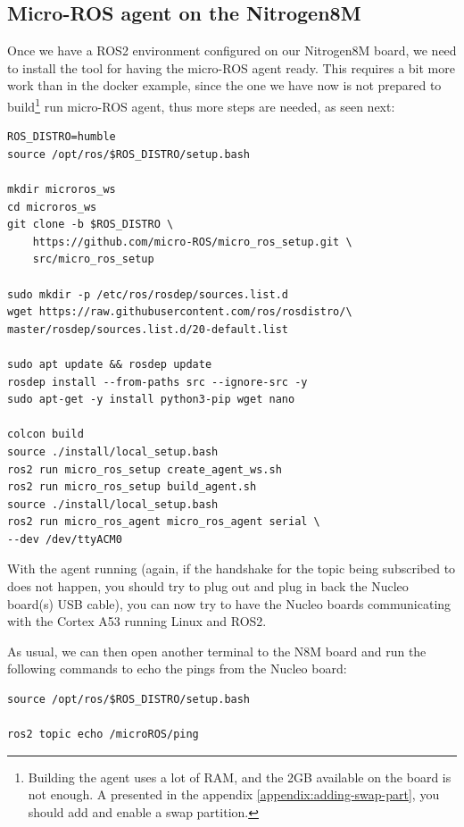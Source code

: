 \documentclass[10pt]{article}
\begin{document}
\subsection{Micro-ROS agent on the Nitrogen8M}
\label{sec:micro-ros-agent}
Once we have a ROS2 environment configured on our Nitrogen8M board, we need to install the tool for having the micro-ROS agent ready.
This requires a bit more work than in the docker example, since the one we have now is not prepared to build\footnote{Building the agent uses a lot of RAM, and the 2GB available on the board is not enough. A presented in the appendix \ref{appendix:adding-swap-part}, you should add and enable a swap partition.} run micro-ROS agent, thus more steps are needed, as seen next:
\begin{tcolorbox}
\begin{verbatim}
ROS_DISTRO=humble
source /opt/ros/$ROS_DISTRO/setup.bash

mkdir microros_ws
cd microros_ws
git clone -b $ROS_DISTRO \
    https://github.com/micro-ROS/micro_ros_setup.git \
    src/micro_ros_setup

sudo mkdir -p /etc/ros/rosdep/sources.list.d
wget https://raw.githubusercontent.com/ros/rosdistro/\
master/rosdep/sources.list.d/20-default.list

sudo apt update && rosdep update
rosdep install --from-paths src --ignore-src -y
sudo apt-get -y install python3-pip wget nano

colcon build
source ./install/local_setup.bash
ros2 run micro_ros_setup create_agent_ws.sh
ros2 run micro_ros_setup build_agent.sh
source ./install/local_setup.bash
ros2 run micro_ros_agent micro_ros_agent serial \
--dev /dev/ttyACM0
\end{verbatim}
\end{tcolorbox}

With the agent running (again, if the handshake for the topic being subscribed to does not happen, you should try to plug out and plug in back the Nucleo board(s) USB cable), you can now try to have the Nucleo boards communicating with the Cortex A53 running Linux and ROS2.

As usual, we can then open another terminal to the N8M board and run the following commands to echo the pings from the Nucleo board:
\begin{tcolorbox}
\begin{verbatim}
source /opt/ros/$ROS_DISTRO/setup.bash

ros2 topic echo /microROS/ping
\end{verbatim}
\end{tcolorbox}
\end{document}
